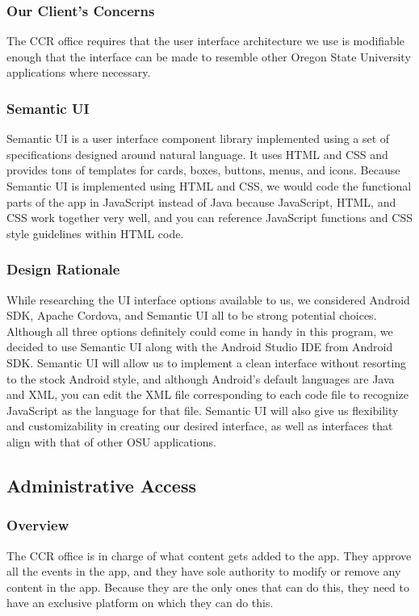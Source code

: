 \documentclass[draftclsnofoot, onecolumn, 10pt, compsoc]{IEEEtran}
\begin{document}
			\subsubsection{Our Client's Concerns}
				The CCR office requires that the user interface architecture we use is modifiable enough that the interface can be made to resemble other Oregon State University applications where necessary.
			\subsubsection{Semantic UI}
				Semantic UI is a user interface component library implemented using a set of specifications designed around natural language. It uses HTML and CSS and provides tons of templates for cards, boxes, buttons, menus, and icons. Because Semantic UI is implemented using HTML and CSS, we would code the functional parts of the app in JavaScript instead of Java because JavaScript, HTML, and CSS work together very well, and you can reference JavaScript functions and CSS style guidelines within HTML code.
				~\cite{Semantic_UI}
			\subsubsection{Design Rationale}
				While researching the UI interface options available to us, we considered Android SDK, Apache Cordova, and Semantic UI all to be strong potential choices. Although all three options definitely could come in handy in this program, we decided to use Semantic UI along with the Android Studio IDE from Android SDK. Semantic UI will allow us to implement a clean interface without resorting to the stock Android style, and although Android's default languages are Java and XML, you can edit the XML file corresponding to each code file to recognize JavaScript as the language for that file. Semantic UI will also give us flexibility and customizability in creating our desired interface, as well as interfaces that align with that of other OSU applications.
				~\cite{SemanticUI_JS}

		\subsection{Administrative Access}
			\subsubsection{Overview}
				The CCR office is in charge of what content gets added to the app. They approve all the events in the app, and they have sole authority to modify or remove any content in the app. Because they are the only ones that can do this, they need to have an exclusive platform on which they can do this.
\end{document}
